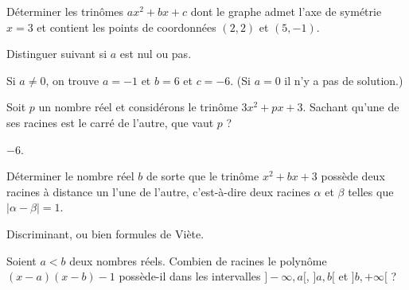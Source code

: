 \begin{exo}
Déterminer les trinômes $ax^2+bx+c$ dont le graphe admet l'axe de symétrie $x=3$ et contient les points de coordonnées $(2,2)$ et $(5,-1)$.
\begin{hint}
Distinguer suivant si $a$ est nul ou pas.
\end{hint}
\begin{sol}
Si $a\neq 0$, on trouve $a=-1$ et $b=6$ et $c=-6$. (Si $a=0$ il n'y a pas de solution.)
\end{sol}
\end{exo}

\begin{exo}
Soit $p$ un nombre réel et considérons le trinôme $3x^2+px+3$.
Sachant qu'une de ses racines est le carré de l'autre, que vaut $p$ ?
\begin{hint}
\end{hint}
\begin{sol}
$-6$.
\end{sol}
\end{exo}

\begin{exo}
Déterminer le nombre réel $b$ de sorte que le trinôme $x^2+bx+3$ possède deux racines à distance un l'une de l'autre, c'est-à-dire deux racines $\alpha$ et $\beta$ telles que $|\alpha-\beta|=1$.
\begin{hint}
\end{hint}
\begin{sol}
Discriminant, ou bien formules de Viète.
\end{sol}
\end{exo}

\begin{exo}
Soient $a<b$ deux nombres réels.
Combien de racines le polynôme $(x-a)(x-b)-1$ possède-il dans les intervalles $]-\infty, a[$,  $]a,b[$ et  $]b,+\infty[$ ?
\begin{hint}
\end{hint}
\begin{sol}
\end{sol}
\end{exo}



\begin{exo}
\begin{hint}
\end{hint}
\begin{sol}
\end{sol}
\end{exo}



